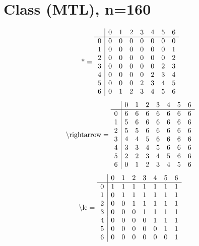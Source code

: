 \documentclass[11pt]{article}
\begin{document}
\section{Class (MTL), n=160}
\[\text{*} = 
\begin{array}{r | r r r r r r r}
 & 0 & 1 & 2 & 3 & 4 & 5 & 6 \\ \hline
0 & 0 & 0 & 0 & 0 & 0 & 0 & 0 \\
1 & 0 & 0 & 0 & 0 & 0 & 0 & 1 \\
2 & 0 & 0 & 0 & 0 & 0 & 0 & 2 \\
3 & 0 & 0 & 0 & 0 & 0 & 2 & 3 \\
4 & 0 & 0 & 0 & 0 & 2 & 3 & 4 \\
5 & 0 & 0 & 0 & 2 & 3 & 4 & 5 \\
6 & 0 & 1 & 2 & 3 & 4 & 5 & 6 \\
\end{array}
\]
\[\text{\textbackslash rightarrow} = 
\begin{array}{r | r r r r r r r}
 & 0 & 1 & 2 & 3 & 4 & 5 & 6 \\ \hline
0 & 6 & 6 & 6 & 6 & 6 & 6 & 6 \\
1 & 5 & 6 & 6 & 6 & 6 & 6 & 6 \\
2 & 5 & 5 & 6 & 6 & 6 & 6 & 6 \\
3 & 4 & 4 & 5 & 6 & 6 & 6 & 6 \\
4 & 3 & 3 & 4 & 5 & 6 & 6 & 6 \\
5 & 2 & 2 & 3 & 4 & 5 & 6 & 6 \\
6 & 0 & 1 & 2 & 3 & 4 & 5 & 6 \\
\end{array}
\]
\[\text{\textbackslash le} = 
\begin{array}{r | r r r r r r r}
 & 0 & 1 & 2 & 3 & 4 & 5 & 6 \\ \hline
0 & 1 & 1 & 1 & 1 & 1 & 1 & 1 \\
1 & 0 & 1 & 1 & 1 & 1 & 1 & 1 \\
2 & 0 & 0 & 1 & 1 & 1 & 1 & 1 \\
3 & 0 & 0 & 0 & 1 & 1 & 1 & 1 \\
4 & 0 & 0 & 0 & 0 & 1 & 1 & 1 \\
5 & 0 & 0 & 0 & 0 & 0 & 1 & 1 \\
6 & 0 & 0 & 0 & 0 & 0 & 0 & 1 \\
\end{array}
\]
\end{document}
